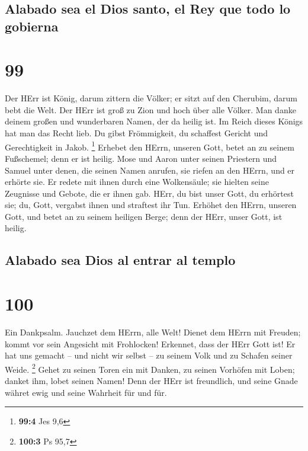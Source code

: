 \hypertarget{alabado-sea-el-dios-santo-el-rey-que-todo-lo-gobierna}{%
\subsection{Alabado sea el Dios santo, el Rey que todo lo
gobierna}\label{alabado-sea-el-dios-santo-el-rey-que-todo-lo-gobierna}}

\hypertarget{section-98}{%
\section{99}\label{section-98}}

 Der HErr ist König, darum zittern die Völker; er sitzt
auf den Cherubim, darum bebt die Welt.  Der HErr ist groß
zu Zion und hoch über alle Völker.  Man danke deinem
großen und wunderbaren Namen, der da heilig ist.  Im Reich
dieses Königs hat man das Recht lieb. Du gibst Frömmigkeit, du schaffest
Gericht und Gerechtigkeit in Jakob. \footnote{\textbf{99:4} Jes 9,6}
 Erhebet den HErrn, unseren Gott, betet an zu seinem
Fußschemel; denn er ist heilig.  Mose und Aaron unter
seinen Priestern und Samuel unter denen, die seinen Namen anrufen, sie
riefen an den HErrn, und er erhörte sie.  Er redete mit
ihnen durch eine Wolkensäule; sie hielten seine Zeugnisse und Gebote,
die er ihnen gab.  HErr, du bist unser Gott, du erhörtest
sie; du, Gott, vergabst ihnen und straftest ihr Tun. 
Erhöhet den HErrn, unseren Gott, und betet an zu seinem heiligen Berge;
denn der HErr, unser Gott, ist heilig.

\hypertarget{alabado-sea-dios-al-entrar-al-templo}{%
\subsection{Alabado sea Dios al entrar al
templo}\label{alabado-sea-dios-al-entrar-al-templo}}

\hypertarget{section-99}{%
\section{100}\label{section-99}}

 Ein Dankpsalm. Jauchzet dem HErrn, alle Welt!
 Dienet dem HErrn mit Freuden; kommt vor sein Angesicht
mit Frohlocken!  Erkennet, dass der HErr Gott ist! Er hat
uns gemacht -- und nicht wir selbst -- zu seinem Volk und zu Schafen
seiner Weide. \footnote{\textbf{100:3} Ps 95,7}  Gehet zu
seinen Toren ein mit Danken, zu seinen Vorhöfen mit Loben; danket ihm,
lobet seinen Namen!  Denn der HErr ist freundlich, und
seine Gnade währet ewig und seine Wahrheit für und für.

